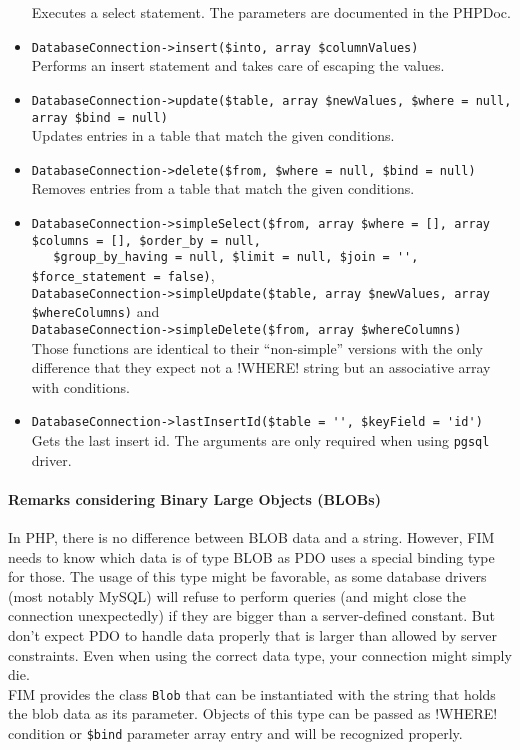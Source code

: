 \documentclass{scrartcl}
\begin{document}
\begin{itemize}
            Executes a select statement. The parameters are documented in the PHPDoc.
         \item \lstinline!DatabaseConnection->insert($into, array $columnValues)! \\
            Performs an insert statement and takes care of escaping the values.
         \item \lstinline!DatabaseConnection->update($table, array $newValues, $where = null, array $bind = null)! \\
            Updates entries in a table that match the given conditions.
         \item \lstinline!DatabaseConnection->delete($from, $where = null, $bind = null)! \\
            Removes entries from a table that match the given conditions.
         \item \lstinline!DatabaseConnection->simpleSelect($from, array $where = [], array $columns = [], $order_by = null,! \\ \lstinline!   $group_by_having = null, $limit = null, $join = '', $force_statement = false)!, \\ \lstinline!DatabaseConnection->simpleUpdate($table, array $newValues, array $whereColumns)! and \\ \lstinline!DatabaseConnection->simpleDelete($from, array $whereColumns)! \\
            Those functions are identical to their ``non-simple'' versions with the only difference that they expect not a \mysql!WHERE! string but an associative array with conditions.
         \item \lstinline!DatabaseConnection->lastInsertId($table = '', $keyField = 'id')! \\
            Gets the last insert id. The arguments are only required when using \texttt{pgsql} driver.
      \end{itemize}
      \paragraph{Remarks considering Binary Large Objects (BLOBs)}
         In PHP, there is no difference between BLOB data and a string. However, FIM needs to know which data is of type BLOB as PDO uses a special binding type for those. The usage of this type might be favorable, as some database drivers (most notably MySQL) will refuse to perform queries (and might close the connection unexpectedly) if they are bigger than a server-defined constant. But don't expect PDO to handle data properly that is larger than allowed by server constraints. Even when using the correct data type, your connection might simply die. \\
         FIM provides the class \lstinline!Blob! that can be instantiated with the string that holds the blob data as its parameter. Objects of this type can be passed as \mysql!WHERE! condition or \lstinline!$bind! parameter array entry and will be recognized properly.
\end{document}
